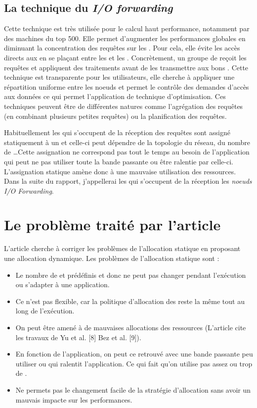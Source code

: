 \documentclass[10pt, a4paper]{article}
\begin{document}
\subsection{La technique du \emph{I/O forwarding}}

Cette technique est très utilisée pour le calcul haut performance, notamment par des machines du top 500\cite{}. Elle permet d'augmenter les performances globales en diminuant la concentration des requêtes sur les \noeudsIO{}. Pour cela, elle évite les accès directs aux \noeudsIO{} en se plaçant entre les \noeudsDeCalculs{} et les \noeudsIO{}. Concrètement, un groupe de \noeudsIO{} reçoit les requêtes et appliquent des traitements avant de les transmettre aux bons \noeudsIO{}. Cette technique est transparente pour les utilisateurs, elle cherche à appliquer une répartition uniforme entre les noeuds et permet le contrôle des demandes d'accès aux données ce qui permet l'application de technique d'optimisation. Ces techniques peuvent être de différentes natures comme l'agrégation des requêtes (en combinant plusieurs petites requêtes) ou la planification des requêtes.

Habituellement les \noeudsIO{} qui s'occupent de la réception des requêtes sont assigné statiquement à un \noeudDeCalculs{} et celle-ci peut dépendre de la topologie du réseau, du nombre de \noeudsIO{}\dots Cette assignation ne correspond pas tout le temps au besoin de l'application qui peut ne pas utiliser toute la bande passante ou être ralentie par celle-ci. L'assignation statique amène donc à une mauvaise utilisation des ressources. Dans la suite du rapport, j'appellerai les \noeudsIO{} qui s'occupent de la réception les \emph{noeuds I/O Forwarding}.

\section{Le problème traité par l'article}

L'article cherche à corriger les problèmes de l'allocation statique en proposant une allocation dynamique.
Les problèmes de l'allocation statique sont :
\begin{itemize}
  \item Le nombre de \noeudsIO{} et prédéfinis et donc ne peut pas changer pendant l'exécution ou s'adapter à une application.
  \item Ce n'est pas flexible, car la politique d'allocation des \noeudsIO{} reste la même tout au long de l'exécution.
  \item On peut être amené à de mauvaises allocations des ressources (L'article cite les travaux de Yu et al. [8] Bez et al. [9])\cite{}.
  \item En fonction de l'application, on peut ce retrouvé avec une bande passante peu utiliser ou qui ralentit l'application. Ce qui fait qu'on utilise pas assez ou trop de \noeudsIO{}.
  \item Ne permets pas le changement facile de la stratégie d'allocation sans avoir un mauvais impacte sur les performances.
\end{itemize}
\end{document}
